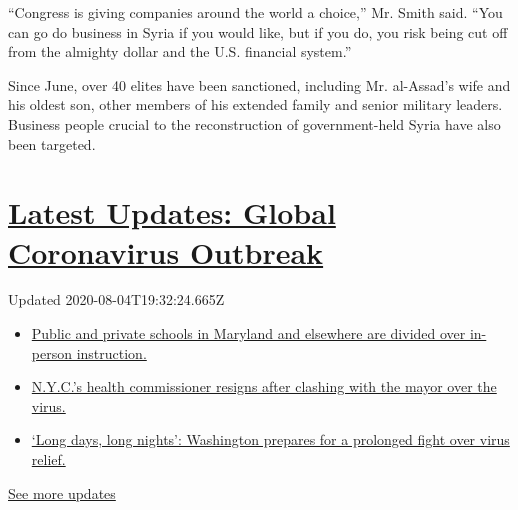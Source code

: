 ``Congress is giving companies around the world a choice,'' Mr. Smith
said. ``You can go do business in Syria if you would like, but if you
do, you risk being cut off from the almighty dollar and the U.S.
financial system.''

Since June, over 40 elites have been sanctioned, including Mr.
al-Assad's wife and his oldest son, other members of his extended family
and senior military leaders. Business people crucial to the
reconstruction of government-held Syria have also been targeted.

\hypertarget{latest-updates-global-coronavirus-outbreak}{%
\section{\texorpdfstring{\href{https://www.nytimes.com/2020/08/04/world/coronavirus-cases.html?action=click\&pgtype=Article\&state=default\&region=MAIN_CONTENT_1\&context=storylines_live_updates}{Latest
Updates: Global Coronavirus
Outbreak}}{Latest Updates: Global Coronavirus Outbreak}}\label{latest-updates-global-coronavirus-outbreak}}

Updated 2020-08-04T19:32:24.665Z

\begin{itemize}
\tightlist
\item
  \href{https://www.nytimes.com/2020/08/04/world/coronavirus-cases.html?action=click\&pgtype=Article\&state=default\&region=MAIN_CONTENT_1\&context=storylines_live_updates\#link-4825b93}{Public
  and private schools in Maryland and elsewhere are divided over
  in-person instruction.}
\item
  \href{https://www.nytimes.com/2020/08/04/world/coronavirus-cases.html?action=click\&pgtype=Article\&state=default\&region=MAIN_CONTENT_1\&context=storylines_live_updates\#link-4d1eafa8}{N.Y.C.'s
  health commissioner resigns after clashing with the mayor over the
  virus.}
\item
  \href{https://www.nytimes.com/2020/08/04/world/coronavirus-cases.html?action=click\&pgtype=Article\&state=default\&region=MAIN_CONTENT_1\&context=storylines_live_updates\#link-6b644638}{`Long
  days, long nights': Washington prepares for a prolonged fight over
  virus relief.}
\end{itemize}

\href{https://www.nytimes.com/2020/08/04/world/coronavirus-cases.html?action=click\&pgtype=Article\&state=default\&region=MAIN_CONTENT_1\&context=storylines_live_updates}{See
more updates}

